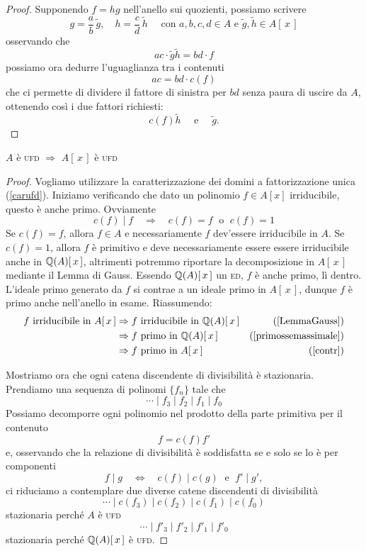 \begin{multicols}{2}
\begin{proof}
	 Supponendo $ f = hg $ nell'anello sui quozienti, possiamo scrivere
	 \[ g = \frac{a}{b}\,\tilde{g}, \quad h = \frac{c}{d}\,\tilde{h} \quad \text{ con } a, b, c, d \in A \text{ e } \tilde{g}, \tilde{h} \in A[\,x\,]   \]
	 osservando che
	 \[ ac \cdot \tilde{g}\tilde{h} = bd \cdot f \]
	 possiamo ora dedurre l'uguaglianza tra i contenuti
	 \[ ac = bd \cdot c(f) \]
	 che ci permette di dividere il fattore di sinistra per $ bd $ senza paura di uscire da $ A $, ottenendo così i due fattori richiesti: $$  c(f) \tilde{h} \quad\text{ e }\quad \tilde{g}.  $$
\end{proof}
\columnbreak
\begin{theorem}
	$ A $ è \textsc{ufd} $ \Rightarrow $ $ A[\,x\,] $ è \textsc{ufd}
\end{theorem}
\begin{proof}
	Vogliamo utilizzare la caratterizzazione dei domini a fattorizzazione unica (\ref{carufd}). 
	Iniziamo verificando che dato un polinomio $ f \in A[x] $ irriducibile, questo è anche primo. Ovviamente 
	\[ c(f) \mid f \quad\Rightarrow\quad c(f) = f \;\text{ o }\; c(f) = 1 \]
	Se $ c(f) = f $, allora $ f \in A $ e necessariamente $ f $ dev'essere irriducibile in $ A $.
	Se $ c(f) = 1 $, allora $ f $ è primitivo e deve necessariamente essere essere irriducibile anche in $ \mathbb{Q}(A)[\,x\,] $, altrimenti potremmo riportare la decomposizione in $ A[\,x\,] $ mediante il Lemma di Gauss.
	Essendo $ \mathbb{Q}(A)[\,x\,] $ un \textsc{ed}, $ f $ è anche primo, lì dentro. L'ideale primo generato da $ f $ si contrae a un ideale primo in $ A[\,x\,] $, dunque $ f $ è primo anche nell'anello in esame. Riassumendo:
	\begin{align*}
		f \text{ irriducibile in } A[\,x\,] & \Rightarrow f \text{ irriducibile in } \mathbb{Q}(A)[\,x\,] & (\ref{LemmaGauss}) \\
		& \Rightarrow f \text{ primo in } \mathbb{Q}(A)[\,x\,] & (\ref{primossemassimale}) \\
		& \Rightarrow f \text{ primo in } A[\,x\,] & (\ref{contr}) \\
	\end{align*}
	
	
	Mostriamo ora che ogni catena discendente di divisibilità è stazionaria. Prendiamo una sequenza di polinomi $ \{ f_n \} $ tale che
	\[ \cdots \mid f_3 \mid f_2 \mid f_1 \mid f_0 \]
	Possiamo decomporre ogni polinomio nel prodotto della parte primitiva per il contenuto
	\[ f = c(f)f' \]
	e, osservando che la relazione di divisibilità è soddisfatta se e solo se lo è per componenti
	\[ f \mid g \quad\Leftrightarrow\quad c(f) \mid c(g) \;\text{ e }\; f' \mid g', \]
	ci riduciamo a contemplare due diverse catene discendenti di divisibilità
	\[ \cdots \mid c(f_3) \mid c(f_2) \mid c(f_1) \mid c(f_0) \]
	stazionaria perché  $ A $ è \textsc{ufd}
	\[ \cdots \mid f'_3 \mid f'_2 \mid f'_1 \mid f'_0 \]
	stazionaria perché  $ \mathbb{Q}(A)[\,x\,] $ è \textsc{ufd}.
\end{proof}




\end{multicols}
